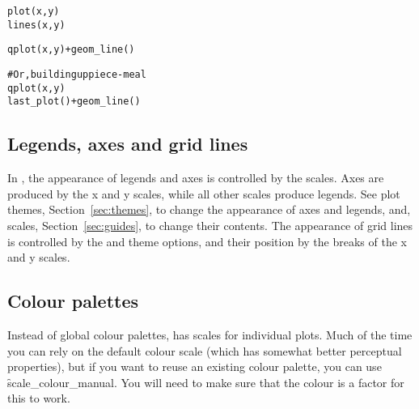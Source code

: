 \begin{alltt}
plot(x, y)
lines(x, y)

qplot(x, y) + geom_line()

# Or, building up piece-meal
qplot(x, y)
last_plot() + geom_line()
\end{alltt}

\subsection{Legends, axes and grid lines} 

In \ggplot, the appearance of legends and axes is controlled by the scales. Axes are produced by the x and y scales, while all other scales produce legends. See plot themes, Section~\ref{sec:themes}, to change the appearance of axes and legends, and, scales, Section~\ref{sec:guides}, to change their contents. The appearance of grid lines is controlled by the  and  theme options, and their position by the breaks of the x and y scales.


% 
% 


\subsection{Colour palettes}

Instead of global colour palettes, \ggplot has scales for individual plots.  Much of the time you can rely on the default colour scale (which has somewhat better perceptual properties), but if you want to reuse an existing colour palette, you can use \f{scale_colour_manual}.  You will need to make sure that the colour is a factor for this to work.

